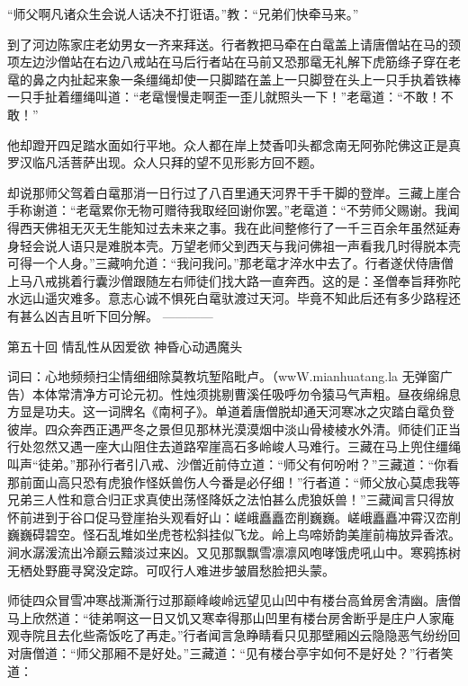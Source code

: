 \documentclass[12pt,UTF8]{ctexbook}
\begin{document}
“师父啊凡诸众生会说人话决不打诳语。”教：“兄弟们快牵马来。”

到了河边陈家庄老幼男女一齐来拜送。行者教把马牵在白鼋盖上请唐僧站在马的颈项左边沙僧站在右边八戒站在马后行者站在马前又恐那鼋无礼解下虎筋绦子穿在老鼋的鼻之内扯起来象一条缰绳却使一只脚踏在盖上一只脚登在头上一只手执着铁棒一只手扯着缰绳叫道：“老鼋慢慢走啊歪一歪儿就照头一下！”老鼋道：“不敢！不敢！”

他却蹬开四足踏水面如行平地。众人都在岸上焚香叩头都念南无阿弥陀佛这正是真罗汉临凡活菩萨出现。众人只拜的望不见形影方回不题。

却说那师父驾着白鼋那消一日行过了八百里通天河界干手干脚的登岸。三藏上崖合手称谢道：“老鼋累你无物可赠待我取经回谢你罢。”老鼋道：“不劳师父赐谢。我闻得西天佛祖无灭无生能知过去未来之事。我在此间整修行了一千三百余年虽然延寿身轻会说人语只是难脱本壳。万望老师父到西天与我问佛祖一声看我几时得脱本壳可得一个人身。”三藏响允道：“我问我问。”那老鼋才淬水中去了。行者遂伏侍唐僧上马八戒挑着行囊沙僧跟随左右师徒们找大路一直奔西。这的是：圣僧奉旨拜弥陀水远山遥灾难多。意志心诚不惧死白鼋驮渡过天河。毕竟不知此后还有多少路程还有甚么凶吉且听下回分解。
------------

第五十回 情乱性从因爱欲 神昏心动遇魔头

词曰：心地频频扫尘情细细除莫教坑堑陷毗卢。（wwW.mianhuatang.la 无弹窗广告）本体常清净方可论元初。性烛须挑剔曹溪任吸呼勿令猿马气声粗。昼夜绵绵息方显是功夫。这一词牌名《南柯子》。单道着唐僧脱却通天河寒冰之灾踏白鼋负登彼岸。四众奔西正遇严冬之景但见那林光漠漠烟中淡山骨棱棱水外清。师徒们正当行处忽然又遇一座大山阻住去道路窄崖高石多岭峻人马难行。三藏在马上兜住缰绳叫声“徒弟。”那孙行者引八戒、沙僧近前侍立道：“师父有何吩咐？”三藏道：“你看那前面山高只恐有虎狼作怪妖兽伤人今番是必仔细！”行者道：“师父放心莫虑我等兄弟三人性和意合归正求真使出荡怪降妖之法怕甚么虎狼妖兽！”三藏闻言只得放怀前进到于谷口促马登崖抬头观看好山：嵯峨矗矗峦削巍巍。嵯峨矗矗冲霄汉峦削巍巍碍碧空。怪石乱堆如坐虎苍松斜挂似飞龙。岭上鸟啼娇韵美崖前梅放异香浓。涧水潺湲流出冷巅云黯淡过来凶。又见那飘飘雪凛凛风咆哮饿虎吼山中。寒鸦拣树无栖处野鹿寻窝没定踪。可叹行人难进步皱眉愁脸把头蒙。

师徒四众冒雪冲寒战澌澌行过那巅峰峻岭远望见山凹中有楼台高耸房舍清幽。唐僧马上欣然道：“徒弟啊这一日又饥又寒幸得那山凹里有楼台房舍断乎是庄户人家庵观寺院且去化些斋饭吃了再走。”行者闻言急睁睛看只见那壁厢凶云隐隐恶气纷纷回对唐僧道：“师父那厢不是好处。”三藏道：“见有楼台亭宇如何不是好处？”行者笑道：
\end{document}
